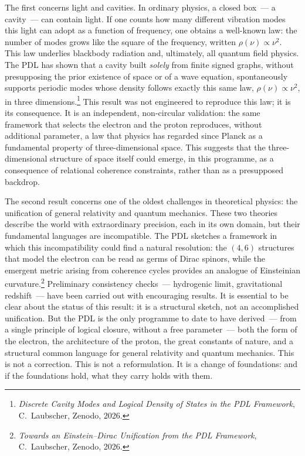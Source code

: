 \documentclass[12pt, a4paper, openright]{book}
\begin{document}
The first concerns light and cavities. In ordinary physics, a closed box~--- a cavity~--- can contain light. If one counts how many different vibration modes this light can adopt as a function of frequency, one obtains a well-known law: the number of modes grows like the square of the frequency, written $\rho(\nu) \propto \nu^2$. This law underlies blackbody radiation and, ultimately, all quantum field physics. The PDL has shown that a cavity built \emph{solely} from finite signed graphs, without presupposing the prior existence of space or of a wave equation, spontaneously supports periodic modes whose density follows exactly this same law, $\rho(\nu) \propto \nu^2$, in three dimensions.\footnote{\textit{Discrete Cavity Modes and Logical Density of States in the PDL Framework}, C.~Laubscher, Zenodo, 2026.} This result was not engineered to reproduce this law; it is its consequence. It is an independent, non-circular validation: the same framework that selects the electron and the proton reproduces, without additional parameter, a law that physics has regarded since Planck as a fundamental property of three-dimensional space. This suggests that the three-dimensional structure of space itself could emerge, in this programme, as a consequence of relational coherence constraints, rather than as a presupposed backdrop.

\medskip

The second result concerns one of the oldest challenges in theoretical physics: the unification of general relativity and quantum mechanics. These two theories describe the world with extraordinary precision, each in its own domain, but their fundamental languages are incompatible. The PDL sketches a framework in which this incompatibility could find a natural resolution: the $(4,6)$ structures that model the electron can be read as germs of Dirac spinors, while the emergent metric arising from coherence cycles provides an analogue of Einsteinian curvature.\footnote{\textit{Towards an Einstein--Dirac Unification from the PDL Framework}, C.~Laubscher, Zenodo, 2026.} Preliminary consistency checks~--- hydrogenic limit, gravitational redshift~--- have been carried out with encouraging results. It is essential to be clear about the status of this result: it is a structural sketch, not an accomplished unification. But the PDL is the only programme to date to have derived~--- from a single principle of logical closure, without a free parameter~--- both the form of the electron, the architecture of the proton, the great constants of nature, and a structural common language for general relativity and quantum mechanics. This is not a correction. This is not a reformulation. It is a change of foundations: and if the foundations hold, what they carry holds with them.
\end{document}
